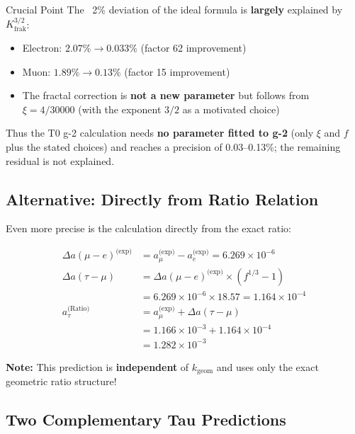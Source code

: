 	\begin{important}{Crucial Point}
		The ~2\% deviation of the ideal formula is \textbf{largely} explained by $K_\text{frak}^{3/2}$:
		\begin{itemize}
			\item Electron: $2.07\% \to 0.033\%$ (factor 62 improvement)
			\item Muon: $1.89\% \to 0.13\%$ (factor 15 improvement)
			\item The fractal correction is \textbf{not a new parameter} but follows from $\xi = 4/30000$ (with the exponent $3/2$ as a motivated choice)
		\end{itemize}
		
		Thus the T0 g-2 calculation needs \textbf{no parameter fitted to g-2} (only $\xi$ and $f$ plus the stated choices) and reaches a precision of 0.03--0.13\%; the remaining residual is not explained.
	\end{important}
	
	\subsection{Alternative: Directly from Ratio Relation}
	
	Even more precise is the calculation directly from the exact ratio:
	
	\begin{align}
		\Delta a(\mu-e)^{\text{(exp)}} &= a_\mu^{\text{(exp)}} - a_e^{\text{(exp)}} = 6.269 \times 10^{-6} \\
		\Delta a(\tau-\mu) &= \Delta a(\mu-e)^{\text{(exp)}} \times (f^{1/3} - 1) \\
		&= 6.269 \times 10^{-6} \times 18.57 = 1.164 \times 10^{-4} \\
		a_\tau^{\text{(Ratio)}} &= a_\mu^{\text{(exp)}} + \Delta a(\tau-\mu) \\
		&= 1.166 \times 10^{-3} + 1.164 \times 10^{-4} \\
		&= \boxed{1.282 \times 10^{-3}}
	\end{align}
	
	\textbf{Note:} This prediction is \textbf{independent} of $k_{\text{geom}}$ and uses only the exact geometric ratio structure!
	
	\subsection{Two Complementary Tau Predictions}
	
